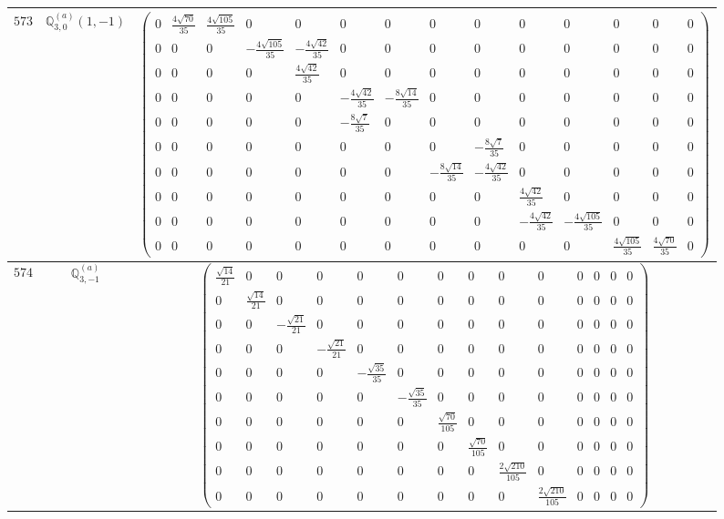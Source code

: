 \documentclass[fleqn,8pt,landscape]{jsarticle}
\begin{document}
\begin{center}
\begin{longtable}{ccc}
$ 573 $ & $ \mathbb{Q}_{3,0}^{(a)}(1,-1) $ & $ \begin{pmatrix} 0 & \frac{4 \sqrt{70}}{35} & \frac{4 \sqrt{105}}{35} & 0 & 0 & 0 & 0 & 0 & 0 & 0 & 0 & 0 & 0 & 0 \\ 0 & 0 & 0 & - \frac{4 \sqrt{105}}{35} & - \frac{4 \sqrt{42}}{35} & 0 & 0 & 0 & 0 & 0 & 0 & 0 & 0 & 0 \\ 0 & 0 & 0 & 0 & \frac{4 \sqrt{42}}{35} & 0 & 0 & 0 & 0 & 0 & 0 & 0 & 0 & 0 \\ 0 & 0 & 0 & 0 & 0 & - \frac{4 \sqrt{42}}{35} & - \frac{8 \sqrt{14}}{35} & 0 & 0 & 0 & 0 & 0 & 0 & 0 \\ 0 & 0 & 0 & 0 & 0 & - \frac{8 \sqrt{7}}{35} & 0 & 0 & 0 & 0 & 0 & 0 & 0 & 0 \\ 0 & 0 & 0 & 0 & 0 & 0 & 0 & 0 & - \frac{8 \sqrt{7}}{35} & 0 & 0 & 0 & 0 & 0 \\ 0 & 0 & 0 & 0 & 0 & 0 & 0 & - \frac{8 \sqrt{14}}{35} & - \frac{4 \sqrt{42}}{35} & 0 & 0 & 0 & 0 & 0 \\ 0 & 0 & 0 & 0 & 0 & 0 & 0 & 0 & 0 & \frac{4 \sqrt{42}}{35} & 0 & 0 & 0 & 0 \\ 0 & 0 & 0 & 0 & 0 & 0 & 0 & 0 & 0 & - \frac{4 \sqrt{42}}{35} & - \frac{4 \sqrt{105}}{35} & 0 & 0 & 0 \\ 0 & 0 & 0 & 0 & 0 & 0 & 0 & 0 & 0 & 0 & 0 & \frac{4 \sqrt{105}}{35} & \frac{4 \sqrt{70}}{35} & 0 \end{pmatrix} $ \\ \hline
$ 574 $ & $ \mathbb{Q}_{3,-1}^{(a)} $ & $ \begin{pmatrix} \frac{\sqrt{14}}{21} & 0 & 0 & 0 & 0 & 0 & 0 & 0 & 0 & 0 & 0 & 0 & 0 & 0 \\ 0 & \frac{\sqrt{14}}{21} & 0 & 0 & 0 & 0 & 0 & 0 & 0 & 0 & 0 & 0 & 0 & 0 \\ 0 & 0 & - \frac{\sqrt{21}}{21} & 0 & 0 & 0 & 0 & 0 & 0 & 0 & 0 & 0 & 0 & 0 \\ 0 & 0 & 0 & - \frac{\sqrt{21}}{21} & 0 & 0 & 0 & 0 & 0 & 0 & 0 & 0 & 0 & 0 \\ 0 & 0 & 0 & 0 & - \frac{\sqrt{35}}{35} & 0 & 0 & 0 & 0 & 0 & 0 & 0 & 0 & 0 \\ 0 & 0 & 0 & 0 & 0 & - \frac{\sqrt{35}}{35} & 0 & 0 & 0 & 0 & 0 & 0 & 0 & 0 \\ 0 & 0 & 0 & 0 & 0 & 0 & \frac{\sqrt{70}}{105} & 0 & 0 & 0 & 0 & 0 & 0 & 0 \\ 0 & 0 & 0 & 0 & 0 & 0 & 0 & \frac{\sqrt{70}}{105} & 0 & 0 & 0 & 0 & 0 & 0 \\ 0 & 0 & 0 & 0 & 0 & 0 & 0 & 0 & \frac{2 \sqrt{210}}{105} & 0 & 0 & 0 & 0 & 0 \\ 0 & 0 & 0 & 0 & 0 & 0 & 0 & 0 & 0 & \frac{2 \sqrt{210}}{105} & 0 & 0 & 0 & 0 \end{pmatrix} $ \\ \hline

\end{longtable}
\end{center}
\end{document}
